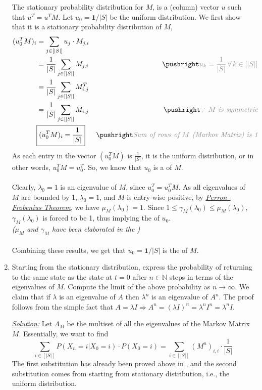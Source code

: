 \documentclass[12pt,titlepage]{report}
\begin{document}
\begin{enumerate}[label=(\alph*)]
    The stationary probability distribution for $M$, is a (column) vector $u$ such that $u^T=u^TM$. Let $u_0=\mathbf{1}/|S|$ be the uniform distribution. We first show that it is a stationary probability distribution of $M$,
    {\allowdisplaybreaks
    \begin{align*}
        (u_0^TM)_i &= \sum_{j\in[|S|]} u_j\cdot M_{j,i} \\
        &= \frac{1}{|S|} \sum_{j\in[|S|]} M_{j,i} \comment{u_k=\frac{1}{|S|}\,\forall\, k\in[|S|]} \\
        &= \frac{1}{|S|} \sum_{j\in[|S|]} M^T_{i,j} \\
        &= \frac{1}{|S|} \sum_{j\in[|S|]} M_{i,j} \comment{\because\, M \textit{ is symmetric}}\\
        &\boxed{(u_0^TM)_i = \frac{1}{|S|}} \comment{\textit{Sum of rows of $M$ (Markov Matrix) is 1}}
    \end{align*}}
    As each entry in the vector $(u_0^TM)$ is $\frac{1}{|S|}$, it is the uniform distribution, or in other words, $u_0^TM=u_0^T$. So, we know that $u_0$ is a  of $M$. \\ \\
    Clearly, $\lambda_0=1$ is an eigenvalue of $M$, since $u_0^T=u^T_0M$. As all eigenvalues of $M$ are bounded by 1, $\lambda_0=1$, and $M$ is entry-wise positive, by \href{https://en.wikipedia.org/wiki/Perron\%E2\%80\%93Frobenius_theorem}{\color{Cerulean}\textit{Perron--Frobenius Theorem}}, we have $\mu_M(\lambda_0)=1$. Since $1\leq\gamma_M(\lambda_0)\leq\mu_M(\lambda_0)$, $\gamma_M(\lambda_0)$ is forced to be 1, thus implying the  of $u_0$. \\
    \textit{($\mu_M$ and $\gamma_M$ have been elaborated in the )}\\ \\
    Combining these results, we get that $u_0=\mathbf{1}/{|S|}$ is the  of $M$.
    
    \item Starting from the stationary distribution, express the probability of returning to the same state as the state at $t = 0$ after $n \in \mathbb{N}$ steps in terms of the eigenvalues of $M$. Compute the limit of the above probability as $n\rightarrow \infty$.
    We claim that if $\lambda$ is an eigenvalue of $A$ then $\lambda^n$ is an eigenvalue of $A^n$. The proof follows from the simple fact that $A=\lambda I\Rightarrow A^n = (\lambda I)^n = \lambda^n I^n=\lambda^n I$.\\
    \item[\underline{\textit{Solution:}}] Let $\Lambda_M$ be the multiset of all the eigenvalues of the Markov Matrix $M$. Essentially, we want to find
    $$\sum_{i\in[|S|]} P(X_n=i|X_0=i)\cdot P(X_0=i) = \sum_{i\in[|S|]} (M^n)_{i,i} \cdot\frac{1}{|S|}$$
    The first substitution has already been proved above in , and the second substitution comes from starting from stationary distribution, i.e., the uniform distribution.
    

\end{enumerate}
\end{document}
